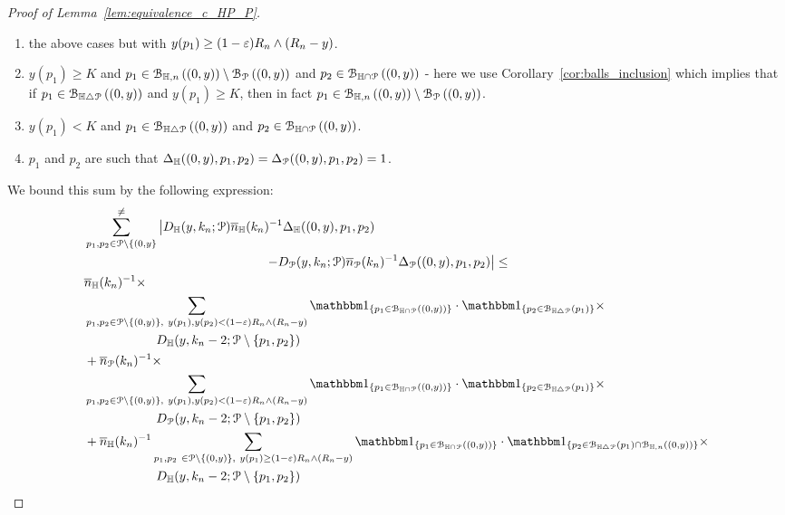 \begin{proof}[Proof of Lemma~\ref{lem:equivalence_c_HP_P}]
\begin{enumerate}
\item the above cases but with $y(p_1) \geq (1-\varepsilon) R_n \wedge (R_n -y)$. 
\item $y(p_1) \geq K$ and $p_1 \in {\mathcal B}_{\mathbb{H},n}\left((0,y)\right) \setminus 
{\mathcal B}_{{\mathcal P}}\left((0,y)\right)$ and $p_2 \in {\mathcal B}_{\mathbb{H} \cap {\mathcal P}}\left((0,y)\right)$ - here we use 
Corollary~\ref{cor:balls_inclusion} which implies that if $p_1 \in {\mathcal B}_{\mathbb{H} \bigtriangleup {\mathcal P}}\left((0,y)\right)$ and $y(p_1) \geq K$, then in fact $p_1 \in {\mathcal B}_{\mathbb{H},n}\left((0,y)\right) \setminus 
{\mathcal B}_{{\mathcal P}}\left((0,y)\right)$. 
\item $y(p_1) < K$ and $p_1 \in {\mathcal B}_{\mathbb{H} \bigtriangleup {\mathcal P}}\left((0,y)\right)$ and $p_2 \in {\mathcal B}_{\mathbb{H} \cap {\mathcal P}}\left((0,y)\right)$. 
\item $p_1$ and $p_2$ are such that $\Delta_{\mathbb{H}} ((0,y),p_1,p_2)=\Delta_{{\mathcal P}} ((0,y),p_1,p_2)=1$. 
\end{enumerate}
We bound this sum by the following expression:
\begin{align} 
& \sum_{p_1,p_2 \in \Pcal \setminus \{(0,y\}}^{\not =} 
  \left| D_{\H}(y,k_n; \Pcal) \expH^{-1} \Delta_\H ((0,y),p_1,p_2) \right. \nonumber \\
& \hspace{5cm} 
 \left. -   D_{\Pcal} (y,k_n;\Pcal) \expP^{-1} \Delta_{\Pcal} ((0,y),p_1,p_2) \right| \leq \nonumber 
 \\
& \expH^{-1} \times \nonumber \\
& \sum_{p_1,p_2\in \Pcal \setminus \{(0,y)\},\  y(p_1),y(p_2)< (1-\eps)R_n \wedge (R_n-y)} \ind{p_1 \in \BallInter{(0,y)}} \cdot \ind{p_2 \in \BallSym{p_1}} \times \nonumber \\
& \hspace{2cm} 
D_\H (y,k_n-2;\Pcal \setminus \{ p_1,p_2\}) 
\label{eq:sum_1}\\
&+ \expP^{-1} \times \nonumber \\
& \sum_{p_1,p_2\in \Pcal \setminus \{(0,y)\},\  y(p_1),y(p_2)< (1-\eps)R_n \wedge (R_n-y)} \ind{p_1 \in \BallInter{(0,y)}} \cdot \ind{p_2 \in \BallSym{p_1}} \times \nonumber \\
& \hspace{2cm} D_\Pcal (y,k_n-2;\Pcal \setminus \{ p_1,p_2\}) 
\label{eq:sum_2}  \\
& +\expH^{-1} \sum_{p_1,p_2 \ \in \Pcal \setminus \{(0,y) \}, \ y(p_1) \geq (1-\eps) R_n \wedge (R_n-y)}  \ind{p_1 \in \BallInter{(0,y)}} \cdot \ind{p_2 \in \BallSym{p_1}\cap \BallHyp{(0,y)}}
\times \nonumber \\
&\hspace{2cm} D_\H (y,k_n-2;\Pcal \setminus \{ p_1,p_2\}) \label{eq:sum_3}

\end{align}
\end{proof}
